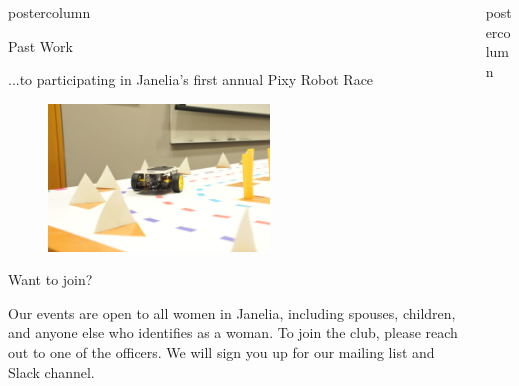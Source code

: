 \documentclass{beamer}
\begin{document}
\begin{frame}
\begin{columns}
\begin{column}{.33\textwidth}
\begin{beamercolorbox}[center,wd=\textwidth]{postercolumn}
\begin{minipage}[T]{.95\textwidth}
{\begin{myblock}{Past Work}
                        \begin{addmargin}[1em]{1em}
                            ...to participating in Janelia's first annual Pixy Robot Race
                        \end{addmargin}
                        \begin{addmargin}[1em]{1em}
                            \begin{figure}
                                \vspace{.5cm}
                                \centering\includegraphics[width=0.59\textwidth]{img/robot.jpg}
                                \vspace{.5cm}
                            \end{figure}
                        \end{addmargin}
                    \end{myblock}
                    \vspace{1cm}
                    \begin{myblock}{Want to join?}
                        \begin{addmargin}[1em]{1em}
                            Our events are open to all women in Janelia, including spouses, children, and anyone else who identifies as a woman. To join the club, please reach out to one of the officers. We will sign you up for our mailing list and Slack channel.
                        \end{addmargin}
                        \vspace{0.6em}
                    \end{myblock}}
		        \end{minipage}\end{beamercolorbox}
  \end{column}
	\begin{column}{.33\textwidth}
		\begin{beamercolorbox}[center,wd=\textwidth]{postercolumn}
			\begin{minipage}[T]{.95\textwidth}

\end{minipage}
\end{beamercolorbox}
\end{column}
\end{columns}
\end{frame}
\end{document}
